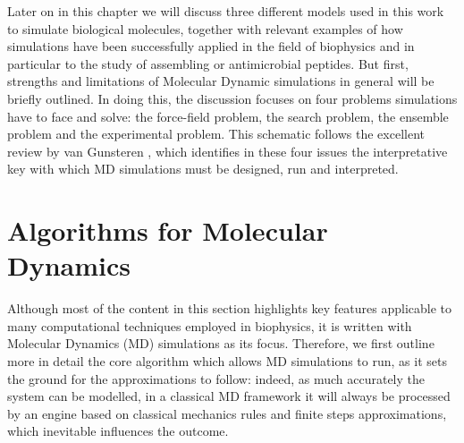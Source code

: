 Later on in this chapter we will discuss three different models used in this work to simulate biological molecules, together with relevant examples of how simulations have been successfully applied in the field of biophysics and in particular to the study of assembling or antimicrobial peptides.
%
But first, strengths and limitations of Molecular Dynamic simulations in general will be briefly outlined. In doing this, the discussion focuses on four problems simulations have to face and solve: the force-field problem, the search problem, the ensemble problem and the experimental problem. This schematic follows the excellent review by van Gunsteren \cite{vanGunsteren2006}, which identifies in these four issues the interpretative key with which MD simulations must be designed, run and interpreted.


\section{Algorithms for Molecular Dynamics}

Although most of the content in this section highlights key features applicable to many computational techniques employed in biophysics, it is written with Molecular Dynamics (MD) simulations as its focus. Therefore, we first outline more in detail the core algorithm which allows MD simulations to run, as it sets the ground for the approximations to follow: indeed, as much accurately the system can be modelled, in a classical MD framework it will always be processed by an engine based on classical mechanics rules and finite steps approximations, which inevitable influences the outcome.

